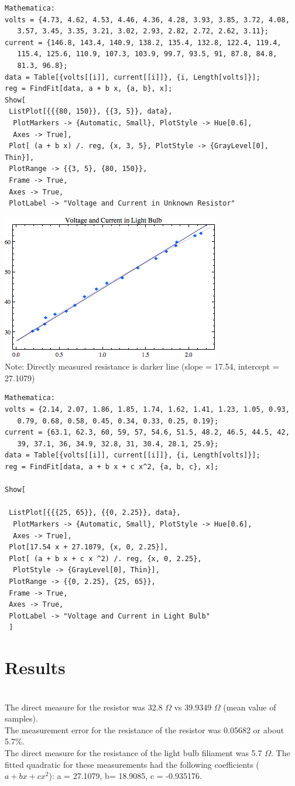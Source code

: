 \documentclass{article}
\begin{document}
{\tiny{
\begin{verbatim}
Mathematica:
volts = {4.73, 4.62, 4.53, 4.46, 4.36, 4.28, 3.93, 3.85, 3.72, 4.08, 
   3.57, 3.45, 3.35, 3.21, 3.02, 2.93, 2.82, 2.72, 2.62, 3.11};
current = {146.8, 143.4, 140.9, 138.2, 135.4, 132.8, 122.4, 119.4, 
   115.4, 125.6, 110.9, 107.3, 103.9, 99.7, 93.5, 91, 87.8, 84.8, 
   81.3, 96.8};
data = Table[{volts[[i]], current[[i]]}, {i, Length[volts]}];
reg = FindFit[data, a + b x, {a, b}, x];
Show[
 ListPlot[{{{80, 150}}, {{3, 5}}, data}, 
  PlotMarkers -> {Automatic, Small}, PlotStyle -> Hue[0.6], 
  Axes -> True],
 Plot[ (a + b x) /. reg, {x, 3, 5}, PlotStyle -> {GrayLevel[0], Thin}],
 PlotRange -> {{3, 5}, {80, 150}},
 Frame -> True,
 Axes -> True,
 PlotLabel -> "Voltage and Current in Unknown Resistor"
\end{verbatim} 
}}
\includegraphics{lab4_graph_2}\\
Note:  Directly measured resistance is darker line (slope = 17.54, intercept = 27.1079)
{\tiny{
\begin{verbatim}
Mathematica:
volts = {2.14, 2.07, 1.86, 1.85, 1.74, 1.62, 1.41, 1.23, 1.05, 0.93, 
   0.79, 0.68, 0.58, 0.45, 0.34, 0.33, 0.25, 0.19};
current = {63.1, 62.3, 60, 59, 57, 54.6, 51.5, 48.2, 46.5, 44.5, 42, 
   39, 37.1, 36, 34.9, 32.8, 31, 30.4, 28.1, 25.9};
data = Table[{volts[[i]], current[[i]]}, {i, Length[volts]}];
reg = FindFit[data, a + b x + c x^2, {a, b, c}, x];

Show[
 
 ListPlot[{{{25, 65}}, {{0, 2.25}}, data}, 
  PlotMarkers -> {Automatic, Small}, PlotStyle -> Hue[0.6], 
  Axes -> True],
 Plot[17.54 x + 27.1079, {x, 0, 2.25}],
 Plot[ (a + b x + c x ^2) /. reg, {x, 0, 2.25}, 
  PlotStyle -> {GrayLevel[0], Thin}],
 PlotRange -> {{0, 2.25}, {25, 65}},
 Frame -> True,
 Axes -> True,
 PlotLabel -> "Voltage and Current in Light Bulb"
 ]
\end{verbatim} 
}}
\section{Results}\hfill\\
The direct measure for the resistor was 32.8 $\Omega$ vs 39.9349 
 $\Omega$ (mean value of samples). \\
The measurement error for the resistance of the resistor was 0.05682 or about 5.7\%.\\
The direct measure for the resistance of the light bulb filiament was 5.7 $\Omega$.  The fitted quadratic for these measurements had the following coefficients ($a+bx+cx^2$): a = 27.1079, b= 18.9085, c = -0.935176.
\end{document}
